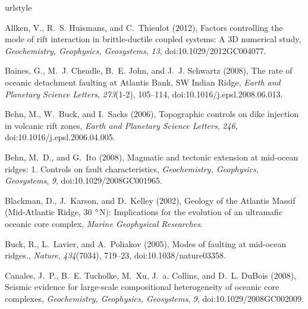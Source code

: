 \documentclass[draft,gc]{agutex}
\begin{document}
\begin{article}
\begin{thebibliography}{39}
\providecommand{\natexlab}[1]{#1}
\expandafter\ifx\csname urlstyle\endcsname\relax
  \providecommand{\doi}[1]{doi:\discretionary{}{}{}#1}\else
  \providecommand{\doi}{doi:\discretionary{}{}{}\begingroup
  \urlstyle{rm}\Url}\fi

Allken, V., R.~S. Huismans, and C.~Thieulot (2012), {Factors controlling the
  mode of rift interaction in brittle-ductile coupled systems: A 3D numerical
  study}, \textit{Geochemistry, Geophysics, Geosystems}, \textit{13},
  \doi{10.1029/2012GC004077}.

Baines, G., M.~J. Cheadle, B.~E. John, and J.~J. Schwartz (2008), {The rate of
  oceanic detachment faulting at Atlantis Bank, SW Indian Ridge}, \textit{Earth
  and Planetary Science Letters}, \textit{273}(1-2), 105--114,
  \doi{10.1016/j.epsl.2008.06.013}.

Behn, M., W.~Buck, and I.~Sacks (2006), {Topographic controls on dike injection
  in volcanic rift zones}, \textit{Earth and Planetary Science Letters},
  \textit{246}, \doi{10.1016/j.epsl.2006.04.005}.

Behn, M.~D., and G.~Ito (2008), {Magmatic and tectonic extension at mid-ocean
  ridges: 1. Controls on fault characteristics}, \textit{Geochemistry,
  Geophysics, Geosystems}, \textit{9}, \doi{10.1029/2008GC001965}.

Blackman, D., J.~Karson, and D.~Kelley (2002), {Geology of the Atlantis Massif
  (Mid-Atlantic Ridge, 30 $\degree$N): Implications for the evolution of an
  ultramafic oceanic core complex}, \textit{Marine Geophysical Researches}.

Buck, R., L.~Lavier, and A.~Poliakov (2005), {Modes of faulting at mid-ocean
  ridges.}, \textit{Nature}, \textit{434}(7034), 719--23,
  \doi{10.1038/nature03358}.

Canales, J.~P., B.~E. Tucholke, M.~Xu, J.~a. Collins, and D.~L. DuBois (2008),
  {Seismic evidence for large-scale compositional heterogeneity of oceanic core
  complexes}, \textit{Geochemistry, Geophysics, Geosystems}, \textit{9},
  \doi{10.1029/2008GC002009}.


\end{thebibliography}
\end{article}
\end{document}
